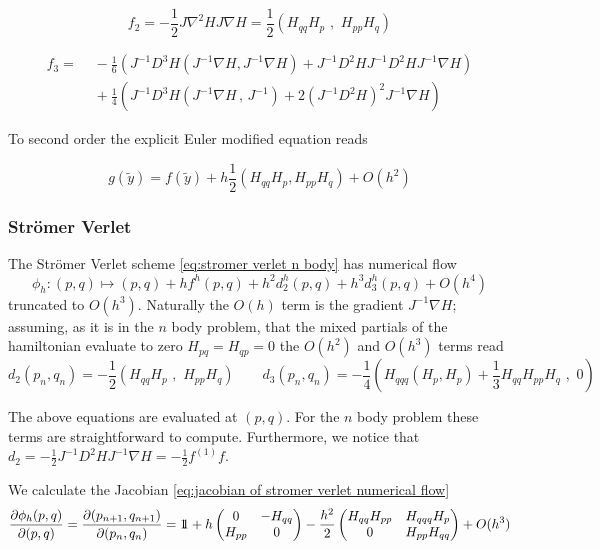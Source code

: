 \documentclass[12pt]{article}
\begin{document}
\begin{equation}\label{eq:modified equation general formula explicit euler f2}
    f_2 = -\frac{1}{2}J\nabla^2HJ\nabla H = \frac{1}{2}\left( H_{qq}H_p \,\,,\,\, H_{pp}H_q \right)
\end{equation}

\begin{equation}\label{eq:modified equation general formula explicit euler f3}
\begin{split}
    f_3 = &\,\, -\frac{1}{6}\left( 
    J^{-1}D^3H \left( J^{-1}\nabla H , J^{-1}\nabla H\right) + J^{-1}D^2H J^{-1}D^2H J^{-1}\nabla H\right)\\
    &\,\, + \frac{1}{4} \left( 
    J^{-1}D^3H (J^{-1}\nabla H\, ,\, J^{-1}) + 2\left( J^{-1}D^2H \right)^2 J^{-1}\nabla H
    \right)
\end{split}
\end{equation}

To second order the explicit Euler modified equation reads

$$
g(\widetilde y) = f(\widetilde y) + h\frac{1}{2}\left( H_{qq}H_p , H_{pp}H_q \right) + O(h^2)
$$

\subsubsection{Str\"omer Verlet}
The Str\"omer Verlet scheme \eqref{eq:stromer verlet n body} has numerical flow 
$$\phi_h : (p,q) \mapsto (p,q) + hf^h(p,q) + h^2d_2^h(p,q) + h^3d_3^h(p,q) + O(h^4)$$
truncated to $O(h^3)$. Naturally the $O(h)$ term is the gradient $J^{-1}\nabla H$; assuming, as it is in the $n$ body problem, that the mixed partials of the hamiltonian evaluate to zero $H_{pq}=H_{qp}=0$ the $O(h^2)$ and $O(h^3)$ terms read
\begin{equation}\label{eq:stromer verlet d2 and d3}
    d_2(p_n,q_n) = -\frac{1}{2}\left( 
    H_{qq}H_p \,\,
    ,\,\,
    H_{pp}H_q \right)
    \qquad
    d_3(p_n,q_n) = -\frac{1}{4}\left(
    H_{qqq}(H_p,H_p) + \frac{1}{3}H_{qq}H_{pp}H_q
    \,\,,\,\, 0\right)
\end{equation}

The above equations are evaluated at $(p,q)$. For the $n$ body problem these terms are straightforward to compute. Furthermore, we notice that $d_2 = -\frac{1}{2} J^{-1}D^2HJ^{-1}\nabla H = -\frac{1}{2}f^{(1)}f$.  

We calculate the Jacobian \eqref{eq:jacobian of stromer verlet numerical flow}
\begin{equation}\label{eq:jacobian of stromer verlet numerical flow}
    \frac{\partial \phi_h(p,q)}{\partial (p,q)} = \frac{\partial(p_{n+1},q_{n+1})}{\partial (p_n,q_n)} = 1\!\!1 +
    h\begin{pmatrix} 0 & -H_{qq}\\ H_{pp} & 0 \end{pmatrix} - 
    \frac{h^2}{2} \begin{pmatrix} H_{qq}H_{pp} & H_{qqq}H_p\\ 0 & H_{pp}H_{qq} \end{pmatrix} + O(h^3)
\end{equation}
\end{document}
